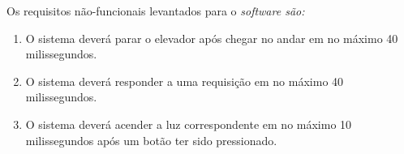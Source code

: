 Os requisitos não-funcionais levantados para o \it{software} são:

\begin{enumerate}[label=RNF \arabic*. , ref=\arabic*]
	\item O sistema deverá parar o elevador após chegar no andar em no máximo 40 milissegundos.
  \item O sistema deverá responder a uma requisição em no máximo 40 milissegundos.
  \item O sistema deverá acender a luz correspondente em no máximo 10 milissegundos após um botão ter sido pressionado.
\end{enumerate}
